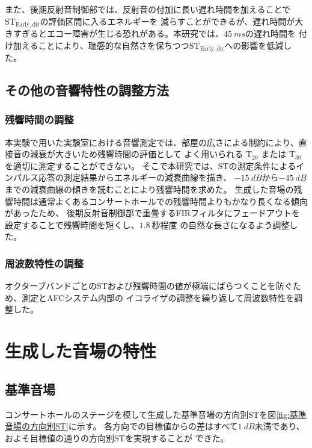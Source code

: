 \documentclass[11pt,a4j]{jreport}
\begin{document}
    また、後期反射音制御部では、反射音の付加に長い遅れ時間を加えることで$\mathrm{ST_{Early,dir}}$の評価区間に入るエネルギーを
    減らすことができるが、遅れ時間が大きすぎるとエコー障害が生じる恐れがある。本研究では、$\SI{45}{ms}$の遅れ時間を
    付け加えることにより、聴感的な自然さを保ちつつ$\mathrm{ST_{Early,dir}}$への影響を低減した。

    \subsection{その他の音響特性の調整方法}
      \subsubsection{残響時間の調整}
      本実験で用いた実験室における音響測定では、部屋の広さによる制約により、直接音の減衰が大きいため残響時間の評価として
      よく用いられる $\mathrm{T_{20}}$ または $\mathrm{T_{30}}$ を適切に測定することができない。
      そこで本研究では、$\mathrm{ST}$の測定条件によるインパルス応答の測定結果からエネルギーの減衰曲線を描き、
      $\SI{-15}{dB}$から$\SI{-45}{dB}$までの減衰曲線の傾きを読むことにより残響時間を求めた。
      生成した音場の残響時間は通常よくあるコンサートホールでの残響時間よりもかなり長くなる傾向があったため、
      後期反射音制御部で重畳するFIRフィルタにフェードアウトを設定することで残響時間を短くし、$\SI{1.8}{秒}$程度
      の自然な長さになるよう調整した。
      
      \subsubsection{周波数特性の調整}
      オクターブバンドごとのSTおよび残響時間の値が極端にばらつくことを防ぐため、測定とAFCシステム内部の
      イコライザの調整を繰り返して周波数特性を調整した。


\section{生成した音場の特性}

  \subsection{基準音場}
  コンサートホールのステージを模して生成した基準音場の方向別STを図\ref{fig:基準音場の方向別ST}に示す。
  各方向での目標値からの差はすべて$\SI{1}{dB}$未満であり、およそ目標値の通りの方向別STを実現することが
  できた。
  
\end{document}
